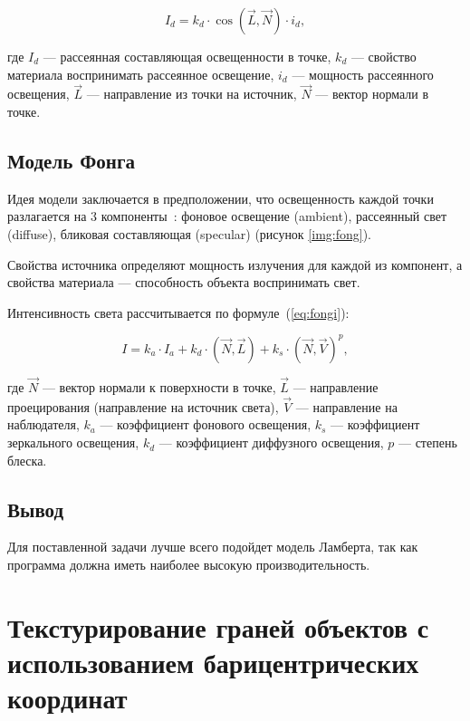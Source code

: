\begin{equation}\label{eq:lambert}
	I_{d} = k_{d} \cdot \cos(\overrightarrow{L}, \overrightarrow{N}) \cdot i_{d},
\end{equation}

\noindent где $I_{d}$ --- рассеянная составляющая освещенности в точке, $k_{d}$ --- свойство материала воспринимать рассеянное освещение, $i_{d}$ --- мощность рассеянного освещения,
$\overrightarrow{L}$ --- направление из точки на источник, $\overrightarrow{N}$ --- вектор нормали в точке.


\subsection{Модель Фонга}

Идея модели заключается в предположении, что освещенность каждой точки разлагается на 3 компоненты~\cite{light}: фоновое освещение (ambient), рассеянный свет (diffuse), бликовая составляющая (specular) (рисунок \ref{img:fong}).

\clearpage
{}

Свойства источника определяют мощность излучения для каждой из компонент, а свойства материала --- способность объекта воспринимать свет.

Интенсивность света рассчитывается по формуле~(\ref{eq:fongi}):

\begin{equation}\label{eq:fongi}
	I = k_{a} \cdot I_{a} + k_{d} \cdot (\overrightarrow{N}, \overrightarrow{L}) +  k_{s} \cdot (\overrightarrow{N}, \overrightarrow{V})^p,
\end{equation}

\noindent где $\overrightarrow{N}$ --- вектор нормали к поверхности в точке, $\overrightarrow{L}$ --- направление проецирования (направление на источник света), $\overrightarrow{V}$ --- направление на наблюдателя, $k_{a}$ --- коэффициент фонового освещения, $k_{s}$ --- коэффициент зеркального освещения, $k_{d}$ --- коэффициент диффузного освещения, $p$ --- степень блеска.


\subsection{Вывод}
Для поставленной задачи лучше всего подойдет модель Ламберта, так как программа должна иметь наиболее высокую производительность.


\section{Текстурирование граней объектов с использованием барицентрических координат}

